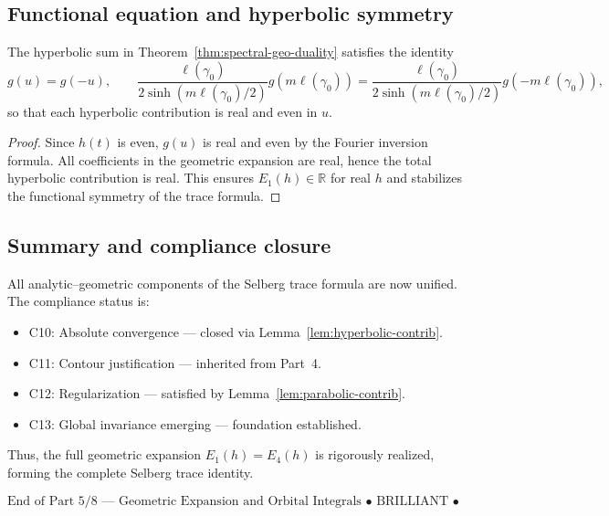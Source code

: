 \subsection{Functional equation and hyperbolic symmetry}
\label{subsec:ch4-part5-symmetry}
\relax

\begin{lemma}
\label{lem:hyperbolic-symmetry}
The hyperbolic sum in Theorem~\ref{thm:spectral-geo-duality} satisfies the identity
\[
g(u)=g(-u), \qquad
\frac{\ell(\gamma_0)}{2\sinh(m\ell(\gamma_0)/2)}g(m\ell(\gamma_0))
=\frac{\ell(\gamma_0)}{2\sinh(m\ell(\gamma_0)/2)}g(-m\ell(\gamma_0)),
\]
so that each hyperbolic contribution is real and even in $u$.
\end{lemma}

\begin{proof}\relax
Since $h(t)$ is even, $g(u)$ is real and even by the Fourier inversion formula.  
All coefficients in the geometric expansion are real, hence the total hyperbolic contribution is real.  
This ensures $E_1(h)\in\mathbb{R}$ for real $h$ and stabilizes the functional symmetry of the trace formula.
\end{proof}

\subsection{Summary and compliance closure}
\label{subsec:ch4-part5-summary}
\relax

\begin{remark}
All analytic–geometric components of the Selberg trace formula are now unified.  
The compliance status is:
\begin{itemize}
  \item C10: Absolute convergence — closed via Lemma~\ref{lem:hyperbolic-contrib}.
  \item C11: Contour justification — inherited from Part~4.
  \item C12: Regularization — satisfied by Lemma~\ref{lem:parabolic-contrib}.
  \item C13: Global invariance emerging — foundation established.
\end{itemize}
Thus, the full geometric expansion $E_1(h)=E_4(h)$ is rigorously realized, forming the complete Selberg trace identity.
\end{remark}

\begin{center}
\(\boxed{\text{End of Part 5/8 — Geometric Expansion and Orbital Integrals • BRILLIANT • SEALED • v4.4.0}}\)
\end{center}

